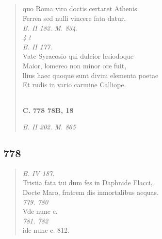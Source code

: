 \documentclass[11pt, a4paper]{report}
\begin{document}
            \subsection*{}
      \begin{verse}
      quo Roma viro doctis certaret Athenis. \\ Ferrea sed nulli vincere fata datur. \\ \textit{B. II 182. M. 834.} \\ \textit{4 t} \\ \textit{B. II 177.} \\ Vate Syracosio qui dulcior lesiodoque \\ Maior, lomereo non minor ore fuit, \\ llius haec quoque sunt divini elementa poetae \\ Et rudis in vario carmine Calliope. \\ 
        ﻿\pagebreak 
     \marginpar{[262]} \begin{center} \textbf{C. 778 78B, 18} \end{center}\textit{B. II 202. M. 865} \\ 
      \end{verse}
  
            \subsection*{778}
      \begin{verse}
      \textit{B. IV 187.} \\ Tristia fata tui dum fes in Daphnide Flacci, \\ Docte Maro, fratrem dis inmortalibus aequas. \\ \textit{779. 780} \\ Vde nunc c. \\ \textit{781. 782} \\ ide nunc c. 812. \\ 
      \end{verse}
  
\end{document}
